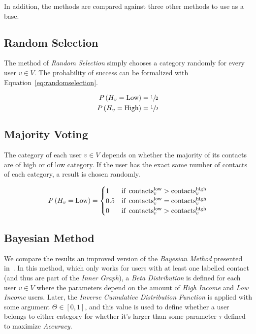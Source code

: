 In addition, the methods are compared against three other methods to use as a base.

\subsection{Random Selection}

The method of \emph{Random Selection} simply chooses a category randomly for every user $v \in V$. The probability of success can be formalized with Equation~\ref{eq:randomselection}.

\begin{equation}
\label{eq:randomselection}
\begin{aligned}
	P \left( H_v = \text{Low} \right) &= \sfrac{1}{2} \\
	P \left( H_v = \text{High} \right) &= \sfrac{1}{2}
\end{aligned}
\end{equation}

\subsection{Majority Voting}

The category of each user $v \in V$ depends on whether the majority of its contacts are of high or of low category. If the user has the exact same number of contacts of each category, a result is chosen randomly.

\begin{equation}
\label{eq:majorityvoting}
	P \left( H_v = \text{Low} \right) =
	\begin{cases}
		1 & \text{if} \ \operatorname{contacts}^{\operatorname{low}}_v > \operatorname{contacts}^{\operatorname{high}}_v \\
		0.5 & \text{if} \ \operatorname{contacts}^{\operatorname{low}}_v = \operatorname{contacts}^{\operatorname{high}}_v \\
		0 & \text{if} \ \operatorname{contacts}^{\operatorname{low}}_v > \operatorname{contacts}^{\operatorname{high}}_v
	\end{cases}
\end{equation}

\subsection{Bayesian Method}

We compare the results an improved version of the \emph{Bayesian Method} presented in~\cite{fixmanasonam2016}. In this method, which only works for users with at least one labelled contact (and thus are part of the \emph{Inner Graph}), a \emph{Beta Distribution} is defined for each user $v \in V$ where the parameters depend on the amount of \emph{High Income} and \emph{Low Income} users. Later, the \emph{Inverse Cumulative Distribution Function} is applied with some argument $\Theta \in \left[ 0, 1 \right]$, and this value is used to define whether a user belongs to either category for whether it's larger than some parameter $\tau$ defined to maximize \emph{Accuracy}.

